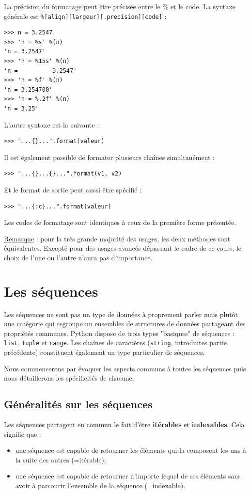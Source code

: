 \documentclass[12pt, a4paper]{article}
\begin{document}
La précision du formatage peut être précisée entre le \% et le code. La syntaxe générale est \lstinline{%[align][largeur][.precision][code]} :
\begin{lstlisting}
>>> n = 3.2547
>>> 'n = %s' %(n)
'n = 3.2547'
>>> 'n = %15s' %(n)
'n =          3.2547'
>>> 'n = %f' %(n)
'n = 3.254700'
>>> 'n = %.2f' %(n)
'n = 3.25'
\end{lstlisting}

L'autre syntaxe est la suivante :
\begin{lstlisting}
>>> "...{}...".format(valeur)
\end{lstlisting}

Il est également possible de formater plusieurs chaînes simultanément :
\begin{lstlisting}
>>> "...{}...{}...".format(v1, v2)
\end{lstlisting}

Et le format de sortie peut aussi être spécifié :
\begin{lstlisting}
>>> "...{:c}...".format(valeur)
\end{lstlisting}

Les codes de formatage sont identiques à ceux de la première forme présentée.

\underline{Remarque} : pour la très grande majorité des usages, les deux méthodes sont équivalentes. Excepté pour des usages avancés dépassant le cadre de ce cours, le choix de l'une ou l'autre n'aura pas d'importance.



\section{Les séquences}
\label{sec:sequences}
Les séquences ne sont pas un type de données à proprement parler mais plutôt une catégorie qui regroupe un ensembles de structures de données partageant des propriétés communes. Python dispose de trois types "basiques" de séquences : \lstinline{list}, \lstinline{tuple} et \lstinline{range}. Les chaînes de caractères (\lstinline{string}, introduites partie précédente) constituent également un type particulier de séquences.

Nous commencerons par évoquer les aspects communs à toutes les séquences puis nous détaillerons les spécificités de chacune.


\subsection{Généralités sur les séquences}
Les séquences partagent en commun le fait d'être \textbf{itérables} et \textbf{indexables}. Cela signifie que :
\begin{itemize}
	\item une séquence est capable de retourner les éléments qui la composent les uns à la suite des autres (=itérable);
	\item une séquence est capable de retourner n'importe lequel de ses éléments sans avoir à parcourir l'ensemble de la séquence (=indexable).
\end{itemize}
\end{document}

